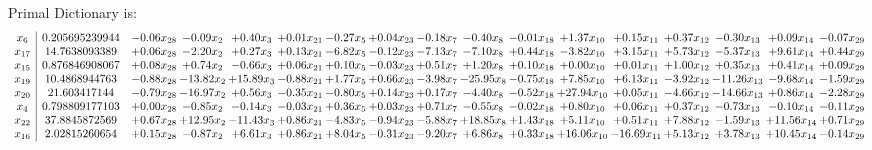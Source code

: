 \documentclass[9pt]{article}
\begin{document}
Primal Dictionary is:
\[\begin{array}{c| c c@{\hskip 2pt} c@{\hskip 2pt} c@{\hskip 2pt} c@{\hskip 2pt} c@{\hskip 2pt} c@{\hskip 2pt} c@{\hskip 2pt} c@{\hskip 2pt} c@{\hskip 2pt} c@{\hskip 2pt} c@{\hskip 2pt} c@{\hskip 2pt} c@{\hskip 2pt} c@{\hskip 2pt} c@{\hskip 2pt} }
 x_{6}   &  0.205695239944 & -0.06 x_{28} & -0.09 x_{2} & +  0.40 x_{3} & +  0.01 x_{21} & -0.27 x_{5} & +  0.04 x_{23} & -0.18 x_{7} & -0.40 x_{8} & -0.01 x_{18} & +  1.37 x_{10} & +  0.15 x_{11} & +  0.37 x_{12} & -0.30 x_{13} & +  0.09 x_{14} & -0.07 x_{29}\\
 x_{17}   &  14.7638093389 & +  0.06 x_{28} & -2.20 x_{2} & +  0.27 x_{3} & +  0.13 x_{21} & -6.82 x_{5} & -0.12 x_{23} & -7.13 x_{7} & -7.10 x_{8} & +  0.44 x_{18} & -3.82 x_{10} & +  3.15 x_{11} & +  5.73 x_{12} & -5.37 x_{13} & +  9.61 x_{14} & +  0.44 x_{29}\\
 x_{15}   &  0.876846908067 & +  0.08 x_{28} & +  0.74 x_{2} & -0.66 x_{3} & +  0.06 x_{21} & +  0.10 x_{5} & -0.03 x_{23} & +  0.51 x_{7} & +  1.20 x_{8} & +  0.10 x_{18} & +  0.00 x_{10} & +  0.01 x_{11} & +  1.00 x_{12} & +  0.35 x_{13} & +  0.41 x_{14} & +  0.09 x_{29}\\
 x_{19}   &  10.4868944763 & -0.88 x_{28} & -13.82 x_{2} & + 15.89 x_{3} & -0.88 x_{21} & +  1.77 x_{5} & +  0.66 x_{23} & -3.98 x_{7} & -25.95 x_{8} & -0.75 x_{18} & +  7.85 x_{10} & +  6.13 x_{11} & -3.92 x_{12} & -11.26 x_{13} & -9.68 x_{14} & -1.59 x_{29}\\
 x_{20}   &  21.603417144 & -0.79 x_{28} & -16.97 x_{2} & +  0.56 x_{3} & -0.35 x_{21} & -0.80 x_{5} & +  0.14 x_{23} & +  0.17 x_{7} & -4.40 x_{8} & -0.52 x_{18} & + 27.94 x_{10} & +  0.05 x_{11} & -4.66 x_{12} & -14.66 x_{13} & +  0.86 x_{14} & -2.28 x_{29}\\
 x_{4}   &  0.798809177103 & +  0.00 x_{28} & -0.85 x_{2} & -0.14 x_{3} & -0.03 x_{21} & +  0.36 x_{5} & +  0.03 x_{23} & +  0.71 x_{7} & -0.55 x_{8} & -0.02 x_{18} & +  0.80 x_{10} & +  0.06 x_{11} & +  0.37 x_{12} & -0.73 x_{13} & -0.10 x_{14} & -0.11 x_{29}\\
 x_{22}   &  37.8845872569 & +  0.67 x_{28} & + 12.95 x_{2} & -11.43 x_{3} & +  0.86 x_{21} & -4.83 x_{5} & -0.94 x_{23} & -5.88 x_{7} & + 18.85 x_{8} & +  1.43 x_{18} & +  5.11 x_{10} & +  0.51 x_{11} & +  7.88 x_{12} & -1.59 x_{13} & + 11.56 x_{14} & +  0.71 x_{29}\\
 x_{16}   &  2.02815260654 & +  0.15 x_{28} & -0.87 x_{2} & +  6.61 x_{3} & +  0.86 x_{21} & +  8.04 x_{5} & -0.31 x_{23} & -9.20 x_{7} & +  6.86 x_{8} & +  0.33 x_{18} & + 16.06 x_{10} & -16.69 x_{11} & +  5.13 x_{12} & +  3.78 x_{13} & + 10.45 x_{14} & -0.14 x_{29}\\

\end{array}\]
\end{document}
